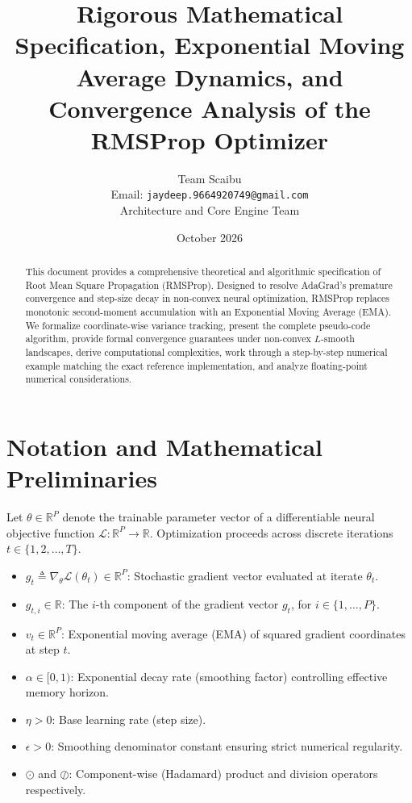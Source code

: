 \documentclass[11pt,a4paper]{article}
\title{\textbf{Rigorous Mathematical Specification, Exponential Moving Average Dynamics, and Convergence Analysis of the RMSProp Optimizer}}
\author{Team Scaibu \\ \small Email: \texttt{jaydeep.9664920749@gmail.com} \\ \small Architecture and Core Engine Team}
\date{October 2026}
\theoremstyle{definition}
\begin{document}
\maketitle

\begin{abstract}
This document provides a comprehensive theoretical and algorithmic specification of Root Mean Square Propagation (RMSProp). Designed to resolve AdaGrad's premature convergence and step-size decay in non-convex neural optimization, RMSProp replaces monotonic second-moment accumulation with an Exponential Moving Average (EMA). We formalize coordinate-wise variance tracking, present the complete pseudo-code algorithm, provide formal convergence guarantees under non-convex $L$-smooth landscapes, derive computational complexities, work through a step-by-step numerical example matching the exact reference implementation, and analyze floating-point numerical considerations.
\end{abstract}

\section{Notation and Mathematical Preliminaries}

Let $\theta \in \mathbb{R}^P$ denote the trainable parameter vector of a differentiable neural objective function $\mathcal{L}: \mathbb{R}^P \to \mathbb{R}$. Optimization proceeds across discrete iterations $t \in \{1, 2, \dots, T\}$.

\begin{itemize}
    \item $g_t \triangleq \nabla_\theta \mathcal{L}(\theta_t) \in \mathbb{R}^P$: Stochastic gradient vector evaluated at iterate $\theta_t$.
    \item $g_{t, i} \in \mathbb{R}$: The $i$-th component of the gradient vector $g_t$, for $i \in \{1, \dots, P\}$.
    \item $v_t \in \mathbb{R}^P$: Exponential moving average (EMA) of squared gradient coordinates at step $t$.
    \item $\alpha \in [0, 1)$: Exponential decay rate (smoothing factor) controlling effective memory horizon.
    \item $\eta > 0$: Base learning rate (step size).
    \item $\epsilon > 0$: Smoothing denominator constant ensuring strict numerical regularity.
    \item $\odot$ and $\oslash$: Component-wise (Hadamard) product and division operators respectively.
\end{itemize}
\end{document}
